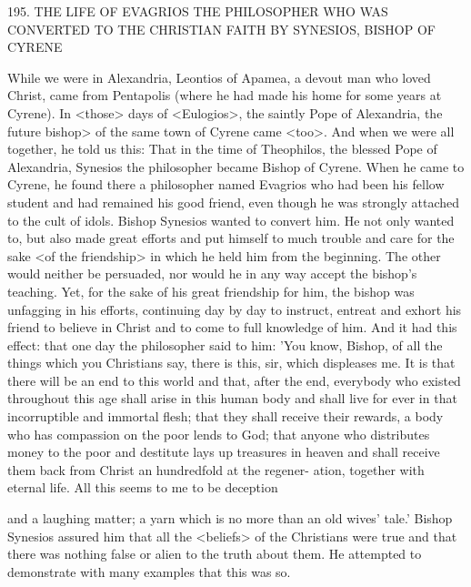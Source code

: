 195. THE LIFE OF EVAGRIOS THE PHILOSOPHER
WHO WAS CONVERTED TO THE CHRISTIAN FAITH BY
SYNESIOS, BISHOP OF CYRENE

While we were in Alexandria, Leontios of Apamea, a devout man
who loved Christ, came from Pentapolis (where he had made his
home for some years at Cyrene). In <those> days of <Eulogios>,
the saintly Pope of Alexandria, the future bishop> of the same town
of Cyrene came <too>. And when we were all together, he told us
this:
That in the time of Theophilos, the blessed Pope of Alexandria,
Synesios the philosopher became Bishop of Cyrene. When he came
to Cyrene, he found there a philosopher named Evagrios who had
been his fellow student and had remained his good friend, even
though he was strongly attached to the cult of idols. Bishop
Synesios wanted to convert him. He not only wanted to, but also
made great efforts and put himself to much trouble and care for the
sake <of the friendship> in which he held him from the beginning.
The other would neither be persuaded, nor would he in any way
accept the bishop's teaching. Yet, for the sake of his great friendship
for him, the bishop was unfagging in his efforts, continuing day by
day to instruct, entreat and exhort his friend to believe in Christ and
to come to full knowledge of him. And it had this effect: that one
day the philosopher said to him: 'You know, Bishop, of all the
things which you Christians say, there is this, sir, which displeases
me. It is that there will be an end to this world and that, after the
end, everybody who existed throughout this age shall arise in this
human body and shall live for ever in that incorruptible and
immortal flesh; that they shall receive their rewards, a body who has
compassion on the poor lends to God; that anyone who distributes
money to the poor and destitute lays up treasures in heaven and
shall receive them back from Christ an hundredfold at the regener-
ation, together with eternal life. All this seems to me to be deception

and a laughing matter; a yarn which is no more than an old wives'
tale.' Bishop Synesios assured him that all the <beliefs> of the
Christians were true and that there was nothing false or alien to the
truth about them. He attempted to demonstrate with many examples
that this was so.

